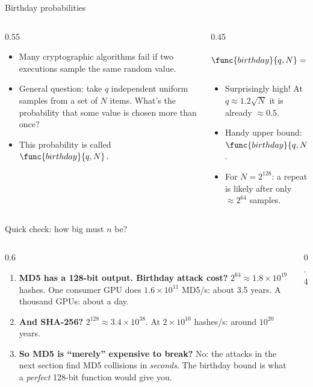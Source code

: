 \ifdefined\PRESENTATION\else\PassOptionsToClass{handout}{beamer}\fi\documentclass[aspectratio=169, lualatex]{beamer}
\begin{document}
\begin{frame}{Birthday probabilities}
	\begin{columns}[c]
		\begin{column}{0.55\textwidth}
			\begin{itemize}
				\item Many cryptographic algorithms fail if two executions sample the same random value.
				\item General question: take $q$ independent uniform samples from a set of $N$ items. What's the probability that some value is chosen more than once?
				\item This probability is called $\func{birthday}{q,N}$.
			\end{itemize}
		\end{column}
		\begin{column}{0.45\textwidth}
			\begin{align*}
				\func{birthday}{q,N} = 1 - \prod_{i=1}^{q-1} \left(1 - \frac{i}{N}\right)
			\end{align*}
			\begin{itemize}
				\item Surprisingly high! At $q \approx 1.2\sqrt{N}$ it is already $\approx 0.5$.
				\item Handy upper bound: $\func{birthday}{q,N} \leq q(q-1)/2N \leq q^2/2N$.
				\item For $N = 2^{128}$: a repeat is likely after only $\approx 2^{64}$ samples.
			\end{itemize}
		\end{column}
	\end{columns}
\end{frame}

\begin{frame}{Quick check: how big must $n$ be?}
	\begin{columns}[c]
		\begin{column}{0.6\textwidth}
			\begin{enumerate}
				\item \textbf{MD5 has a 128-bit output. Birthday attack cost?} \pause
				      $2^{64} \approx 1.8 \times 10^{19}$ hashes. One consumer GPU does $1.6 \times 10^{11}$ MD5/s: about 3.5 years. A thousand GPUs: about a day.
				\item \textbf{And SHA-256?} \pause
				      $2^{128} \approx 3.4 \times 10^{38}$. At $2 \times 10^{10}$ hashes/s: around $10^{20}$ years.
				\item \textbf{So MD5 is ``merely'' expensive to break?} \pause
				      No: the attacks in the next section find MD5 collisions in \emph{seconds}. The birthday bound is what a \emph{perfect} 128-bit function would give you.
			\end{enumerate}
		\end{column}
		\begin{column}{0.4\textwidth}
		\end{column}
	\end{columns}
\end{frame}
\end{document}

